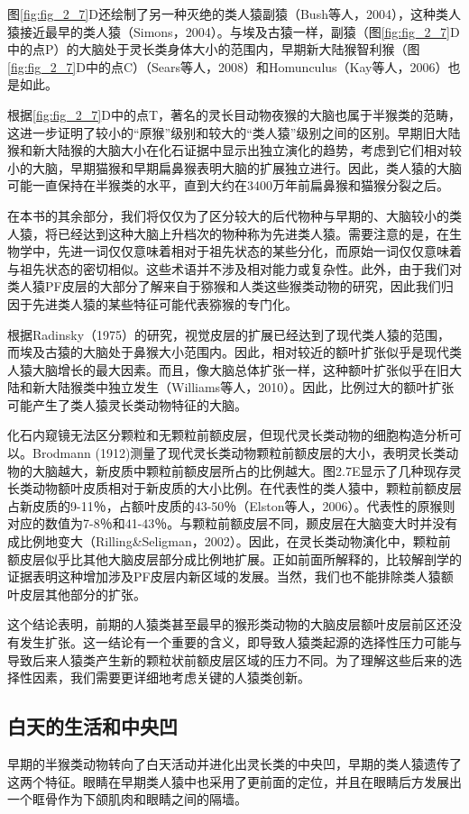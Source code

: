 图\ref{fig:fig_2_7}D还绘制了另一种灭绝的类人猿副猿（Bush等人，2004），这种类人猿接近最早的类人猿（Simons，2004）。与埃及古猿一样，副猿（图\ref{fig:fig_2_7}D中的点P）的大脑处于灵长类身体大小的范围内，早期新大陆猴智利猴（图\ref{fig:fig_2_7}D中的点C）（Sears等人，2008）和Homunculus（Kay等人，2006）也是如此。

根据\ref{fig:fig_2_7}D中的点T，著名的灵长目动物夜猴的大脑也属于半猴类的范畴，这进一步证明了较小的“原猴”级别和较大的“类人猿”级别之间的区别。早期旧大陆猴和新大陆猴的大脑大小在化石证据中显示出独立演化的趋势，考虑到它们相对较小的大脑，早期猫猴和早期扁鼻猴表明大脑的扩展独立进行。因此，类人猿的大脑可能一直保持在半猴类的水平，直到大约在3400万年前扁鼻猴和猫猴分裂之后。

在本书的其余部分，我们将仅仅为了区分较大的后代物种与早期的、大脑较小的类人猿，将已经达到这种大脑上升档次的物种称为先进类人猿。需要注意的是，在生物学中，先进一词仅仅意味着相对于祖先状态的某些分化，而原始一词仅仅意味着与祖先状态的密切相似。这些术语并不涉及相对能力或复杂性。此外，由于我们对类人猿PF皮层的大部分了解来自于猕猴和人类这些猴类动物的研究，因此我们归因于先进类人猿的某些特征可能代表猕猴的专门化。

根据Radinsky（1975）的研究，视觉皮层的扩展已经达到了现代类人猿的范围，而埃及古猿的大脑处于鼻猴大小范围内。因此，相对较近的额叶扩张似乎是现代类人猿大脑增长的最大因素。而且，像大脑总体扩张一样，这种额叶扩张似乎在旧大陆和新大陆猴类中独立发生（Williams等人，2010）。因此，比例过大的额叶扩张可能产生了类人猿灵长类动物特征的大脑。

化石内窥镜无法区分颗粒和无颗粒前额皮层，但现代灵长类动物的细胞构造分析可以。Brodmann (1912)测量了现代灵长类动物颗粒前额皮层的大小，表明灵长类动物的大脑越大，新皮质中颗粒前额皮层所占的比例越大。图2.7E显示了几种现存灵长类动物额叶皮质相对于新皮质的大小比例。在代表性的类人猿中，颗粒前额皮层占新皮质的9-11％，占额叶皮质的43-50％（Elston等人，2006）。代表性的原猴则对应的数值为7-8％和41-43％。与颗粒前额皮层不同，颞皮层在大脑变大时并没有成比例地变大（Rilling\&Seligman，2002）。因此，在灵长类动物演化中，颗粒前额皮层似乎比其他大脑皮层部分成比例地扩展。正如前面所解释的，比较解剖学的证据表明这种增加涉及PF皮层内新区域的发展。当然，我们也不能排除类人猿额叶皮层其他部分的扩张。

这个结论表明，前期的人猿类甚至最早的猴形类动物的大脑皮层额叶皮层前区还没有发生扩张。这一结论有一个重要的含义，即导致人猿类起源的选择性压力可能与导致后来人猿类产生新的颗粒状前额皮层区域的压力不同。为了理解这些后来的选择性因素，我们需要更详细地考虑关键的人猿类创新。

\subsection{白天的生活和中央凹}
早期的半猴类动物转向了白天活动并进化出灵长类的中央凹，早期的类人猿遗传了这两个特征。眼睛在早期类人猿中也采用了更前面的定位，并且在眼睛后方发展出一个眶骨作为下颌肌肉和眼睛之间的隔墙。


